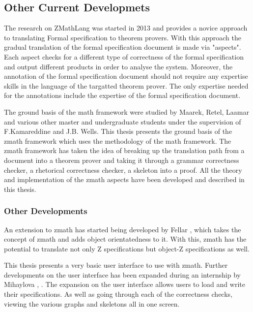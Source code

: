 \subsection{Other Current Developmets}
\label{subsec:currendevelopments}

The research on ZMathLang was started in 2013 and provides a novice approach to
translating Formal specification to theorem provers. With this approach the
gradual translation of the formal specification document is made via "aspects".
Each aspect checks for a different type of correctness of the formal
specification and output different products in order to analyse the system.
Moreover, the annotation of the formal specification document should not require
any expertise skills in the language of the targatted theorem prover. The only
expertise needed for the annotations include the expertise of the formal
specification document.

The ground basis of the \gls{math} framework were studied by Maarek, Retel,
Laamar and various other master and undergraduate students under the supervision
of F.Kamareddine and J.B. Wells. This thesis presents the ground basis of the
\gls{zmath} framework which uses the methodology of the \gls{math} framework.
The \gls{zmath} framework has taken the idea of breaking up the translation path
from a document into a theorem prover and taking it through a grammar
correctness checker, a rhetorical correctness checker, a skeleton into a proof.
All the theory and implementation of the \gls{zmath} aspects have been developed
and described in this thesis.

\subsubsection{Other Developments}

An extension to \gls{zmath} has started being developed by Fellar
\cite{zmathmaster}, \cite{ozmathconference} which takes the concept of
\gls{zmath} and adds object orientatedness to it. With this, \gls{zmath} has the
potential to translate not only Z specifications but object-Z specifications as
well. 

This thesis presents a very basic user interface to use with \gls{zmath}.
Further developments on the user interface has been expanded during an
internship by Mihaylova \cite{zmathuser}, \cite{zmathinternship}. The expansion
on the user interface allows users to load and write their specifications. As
well as going through each of the correctness checks, viewing the various graphs
and skeletons all in one screen.

